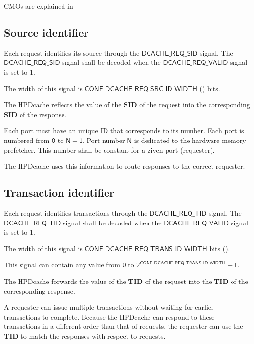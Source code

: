 \documentclass[10pt,titlepage,twoside]{book}
\begin{document}
\acfp{CMO} are explained in 


\subsection{Source identifier}

Each request identifies its source through the $\mathsf{DCACHE\_REQ\_SID}$ signal.
The $\mathsf{DCACHE\_REQ\_SID}$ signal shall be decoded when the $\mathsf{DCACHE\_REQ\_VALID}$ signal is set to 1.

The width of this signal is $\mathsf{CONF\_DCACHE\_REQ\_SRC\_ID\_WIDTH}$ () bits.

The \ac{HPDcache} reflects the value of the \textbf{SID} of the request into the corresponding \textbf{SID} of the response.

Each port must have an unique ID that corresponds to its number.
Each port is numbered from $\mathsf{0}$ to $\mathsf{N-1}$.
Port number $\mathsf{N}$ is dedicated to the hardware memory prefetcher.
This number shall be constant for a given port (requester).

The \ac{HPDcache} uses this information to route responses to the correct requester.


\subsection{Transaction identifier}

Each request identifies transactions through the $\mathsf{DCACHE\_REQ\_TID}$ signal.
The $\mathsf{DCACHE\_REQ\_TID}$ signal shall be decoded when the $\mathsf{DCACHE\_REQ\_VALID}$ signal is set to 1.

The width of this signal is $\mathsf{CONF\_DCACHE\_REQ\_TRANS\_ID\_WIDTH}$ bits ().

This signal can contain any value from $\mathsf{0}$ to $\mathsf{2^{CONF\_DCACHE\_REQ\_TRANS\_ID\_WIDTH} - 1}$.

The \ac{HPDcache} forwards the value of the \textbf{TID} of the request into the \textbf{TID} of the corresponding response.

A requester can issue multiple transactions without waiting for earlier transactions to complete.
Because the \ac{HPDcache} can respond to these transactions in a different order than that of requests, the requester can use the \textbf{TID} to match the responses with respect to requests.
\end{document}
